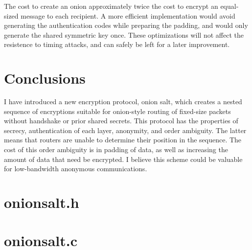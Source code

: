 \documentclass[letterpaper,twocolumn,amsmath,amssymb,pre,aps,10pt]{revtex4-1}
\begin{document}
The cost to create an onion approximately twice the cost to encrypt an
equal-sized message to each recipient.  A more efficient
implementation would avoid generating the authentication codes while
preparing the padding, and would only generate the shared symmetric
key once.  These optimizations will not affect the resistence to
timing attacks, and can safely be left for a later improvement.

\section{Conclusions}

I have introduced a new encryption protocol, onion salt, which creates
a nested sequence of encryptions suitable for onion-style routing of
fixed-size packets without handshake or prior shared secrets.  This
protocol has the properties of secrecy, authentication of each layer,
anonymity, and order ambiguity.  The latter means that routers are
unable to determine their position in the sequence.  The cost of this
order ambiguity is in padding of data, as well as increasing the
amount of data that need be encrypted.  I believe this scheme could be
valuable for low-bandwidth anonymous communications.




\appendix

\begin{widetext}

\section{onionsalt.h}



\section{onionsalt.c}



\end{widetext}
\end{document}
